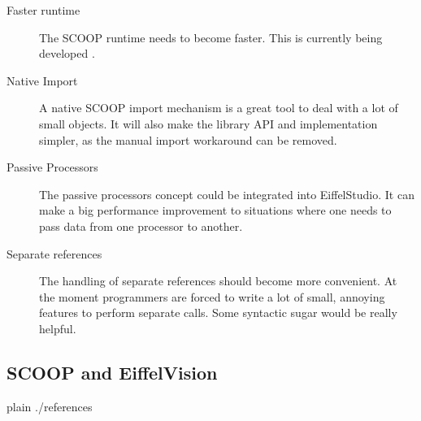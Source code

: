 \documentclass[a4paper,10pt,titlepage]{article}
\begin{document}
\begin{description}
 \item [Faster runtime] The SCOOP runtime needs to become faster. 
 This is currently being developed \cite{thesis:scottwest}.
 \item [Native Import] A native SCOOP import mechanism is a great tool to deal with a lot of small objects.
 It will also make the library API and implementation simpler, as the manual import workaround can be removed.
 \item [Passive Processors] The passive processors concept \cite{paper:passive-processors} could be integrated into EiffelStudio.
 It can make a big performance improvement to situations where one needs to pass data from one processor to another.
 \item [Separate references] The handling of separate references should become more convenient.
 At the moment programmers are forced to write a lot of small, annoying features to perform separate calls.
 Some syntactic sugar would be really helpful.
\end{description}




\newpage
\begin{appendices}

\section{SCOOP and EiffelVision}


\end{appendices}

\newpage
{}
{}
\begin{flushleft}
{{{
 {plain}
 {./references}
}}}
\end{flushleft}

\todos
\end{document}
